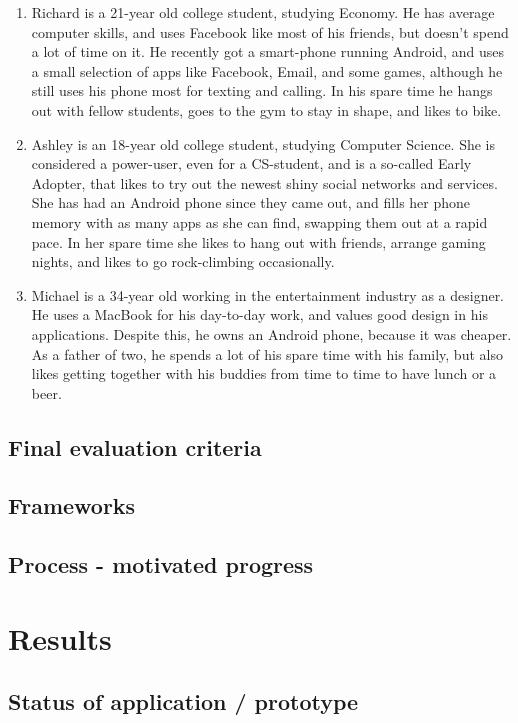 \documentclass[]{report}
\begin{document}
\begin{enumerate}
\item Richard is a 21-year old college student, studying Economy. He has average
  computer skills, and uses Facebook like most of his friends, but doesn't spend
  a lot of time on it. He recently got a smart-phone running Android, and uses a
  small selection of apps like Facebook, Email, and some games, although he
  still uses his phone most for texting and calling. In his spare time he hangs
  out with fellow students, goes to the gym to stay in shape, and likes to bike.
\item Ashley is an 18-year old college student, studying Computer Science. She
  is considered a power-user, even for a CS-student, and is a so-called Early
  Adopter, that likes to try out the newest shiny social networks and
  services. She has had an Android phone since they came out, and fills her
  phone memory with as many apps as she can find, swapping them out at a rapid
  pace. In her spare time she likes to hang out with friends, arrange gaming
  nights, and likes to go rock-climbing occasionally.
\item Michael is a 34-year old working in the entertainment industry as a
  designer. He uses a MacBook for his day-to-day work, and values good design in
  his applications. Despite this, he owns an Android phone, because it was
  cheaper. As a father of two, he spends a lot of his spare time with his
  family, but also likes getting together with his buddies from time to time to
  have lunch or a beer.
\end{enumerate}

\section{Final evaluation criteria}

\section{Frameworks}

\section{Process - motivated progress}

\chapter{Results}

\section{Status of application / prototype}
\end{document}
